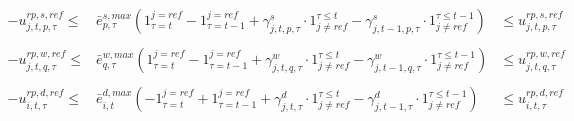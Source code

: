 \begin{align*}
    -u^{rp,s,ref}_{j,t,p,\tau} \leqslant &  \bar{e}^{s,max}_{p,\tau} \left ( 1_{\tau = t}^{j = ref} - 1_{\tau = t-1}^{j = ref} + \gamma^{s}_{j, t, p, \tau}\cdot 1_{j\neq{ref}}^{\tau \leqslant t} - \gamma^{s}_{j, t-1, p, \tau} \cdot 1_{j\neq{ref}}^{\tau \leqslant t-1} \right )& \leqslant u^{rp,s,ref}_{j,t,p,\tau}\\
    & \\
    -u^{rp,w,ref}_{j,t,q,\tau} \leqslant & \bar{e}^{w,max}_{q,\tau} \left( 1_{\tau = t}^{j = ref} - 1_{\tau = t-1}^{j = ref} + \gamma^{w}_{j, t, q, \tau}\cdot 1_{j\neq{ref}}^{\tau \leqslant t} - \gamma^{w}_{j, t-1, q, \tau} \cdot 1_{j\neq{ref}}^{\tau \leqslant t-1} \right ) & \leqslant u^{rp,w,ref}_{j,t,q,\tau} \\
    & \\
    -u^{rp,d,ref}_{i,t,\tau} \leqslant & \bar{e}^{d,max}_{i, t} \left (  - 1_{\tau = t }^{ j = ref} + 1_{\tau = t-1 }^{j = ref} + \gamma^{d}_{j, t,\tau} \cdot 1_{j\neq{ref}}^{\tau \leqslant t} - \gamma^{d}_{j, t-1,\tau} \cdot 1_{j\neq{ref}}^{\tau \leqslant  t-1} \right ) & \leqslant u^{rp,d,ref}_{i,t,\tau} \\
\end{align*}